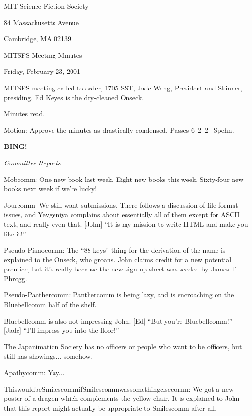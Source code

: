 \documentclass[12pt]{article}
\newcommand{\bing}{{\bf BING!} }
\newcommand{\goto}[1]{\bing \vskip 12pt \centerline{{\em{#1}}}}
\begin{document}
\begin{center}

MIT Science Fiction Society 

84 Massachusetts Avenue

Cambridge, MA 02139

\vspace{12pt}

MITSFS Meeting Minutes 

Friday, February 23, 2001

\end{center}
 
\vspace{18pt}

\setlength{\parskip}{6pt}

\noindent
MITSFS meeting called to order, 1705 SST, Jade Wang, President and
Skinner, presiding.  Ed Keyes is the dry-cleaned Onseck.

Minutes read.

Motion: Approve the minutes as drastically condensed.  Passes 6--2--2+Spehn.

\goto{Committee Reports}

Mobcomm: One new book last week.  Eight new books this week.  Sixty-four
new books next week if we're lucky!

Jourcomm: We still want submissions.  There follows a discussion of file
format issues, and Yevgeniya complains about essentially all of them
except for ASCII text, and really even that.  [John] ``It is my mission
to write HTML and make you like it!''

Pseudo-Pianocomm: The ``88 keys'' thing for the derivation of the name
is explained to the Onseck, who groans.  John claims credit for a new
potential prentice, but it's really because the new sign-up sheet was
seeded by James T. Phrogg.

Pseudo-Panthercomm: Panthercomm is being lazy, and is encroaching on
the Bluebellcomm half of the shelf.

Bluebellcomm is also not impressing John.  [Ed] ``But you're Bluebellcomm!''
[Jade] ``I'll impress you into the floor!''

The Japanimation Society has no officers or people who want to be officers,
but still has showings... somehow.

Apathycomm: Yay...

ThiswouldbeSmilescommifSmilescommwassomethingelsecomm: We got a new
poster of a dragon which complements the yellow chair.  It is explained
to John that this report might actually be appropriate to Smilescomm
after all.
\end{document}
